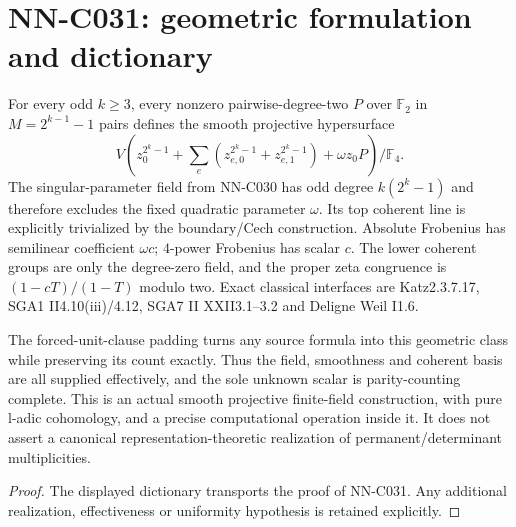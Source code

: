 \section{NN-C031: geometric formulation and dictionary}
\begin{geometricstatement}[NN-C031]
For every odd $k\geq3$, every nonzero pairwise-degree-two $P$ over $\mathbb F_2$ in $M=2^{k-1}-1$ pairs defines the smooth projective hypersurface
\[
 V\left(z_0^{2^k-1}+\sum_e(z_{e,0}^{2^k-1}+z_{e,1}^{2^k-1})
                        +\omega z_0P\right)/\mathbb F_4.
\]
The singular-parameter field from NN-C030 has odd degree $k(2^k-1)$ and therefore excludes the fixed quadratic parameter $\omega$. Its top coherent line is explicitly trivialized by the boundary/Cech construction. Absolute Frobenius has semilinear coefficient $\omega c$; $4$-power Frobenius has scalar $c$. The lower coherent groups are only the degree-zero field, and the proper zeta congruence is $(1-cT)/(1-T)$ modulo two. Exact classical interfaces are Katz2.3.7.17, SGA1 II4.10(iii)/4.12, SGA7 II XXII3.1--3.2 and Deligne Weil I1.6.

The forced-unit-clause padding turns any source formula into this geometric class while preserving its count exactly. Thus the field, smoothness and coherent basis are all supplied effectively, and the sole unknown scalar is parity-counting complete. This is an actual smooth projective finite-field construction, with pure l-adic cohomology, and a precise computational operation inside it. It does not assert a canonical representation-theoretic realization of permanent/determinant multiplicities.
\end{geometricstatement}
\begin{proof} The displayed dictionary transports the proof of NN-C031. Any additional realization, effectiveness or uniformity hypothesis is retained explicitly.\end{proof}


